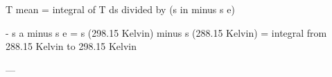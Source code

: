 T mean = integral of T ds divided by (s in minus s e)  

- s a minus s e = s (298.15 Kelvin) minus s (288.15 Kelvin) = integral from 288.15 Kelvin to 298.15 Kelvin  

---